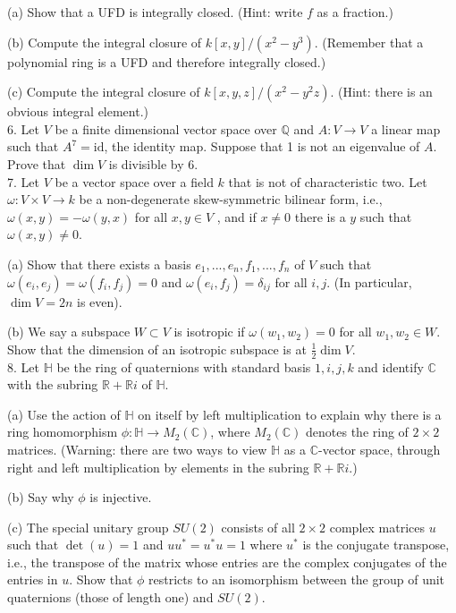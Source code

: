\documentclass[11pt]{article}
\newcommand{\Q}{\mathbb{Q}}
\newcommand{\R}{\mathbb{R}}
\newcommand{\C}{\mathbb{C}}
\begin{document}
(a) Show that a UFD is integrally closed. (Hint: write $f$ as a fraction.)

(b) Compute the integral closure of $k[x,y]/(x^2-y^3)$. (Remember that
a polynomial ring is a UFD and therefore integrally closed.)

(c) Compute the integral closure of $k[x,y,z]/(x^2-y^2z)$. (Hint: there
is an obvious integral element.)\\

6. Let $V$ be a finite dimensional vector space over $\Q$ and $A: V \to V$ a
linear map such that $A^7 = \mbox{id}$, the identity map. Suppose that 1 is not
an eigenvalue of $A$. Prove that $\dim V$ is divisible by 6.\\

7. Let $V$ be a vector space over a field $k$ that is not of characteristic two.
Let $\omega:V\times V \to k$ be a non-degenerate skew-symmetric bilinear form,
i.e., $\omega(x, y) = -\omega (y, x)$ for all $x, y \in V$ , and if $x\neq 0$ there is a $y$ such
that $\omega(x, y) \neq  0$.

(a) Show that there exists a basis $e_1, . . . , e_n, f_1, . . . , f_n$ of $V$ such that $\omega(e_i,e_j) = \omega(f_i,f_j) = 0$ and $\omega(e_i,f_j) = \delta_{ij}$ for all $i,j.$ (In particular, $\dim V = 2n$ is even). 

(b) We say a subspace $W\subset V$ is isotropic if $\omega(w_1,w_2) = 0$ for all $w_1,w_2\in W$. Show that the dimension of an isotropic subspace is
at $\frac{1}{2}\dim V$.\\

8. Let $\mathbb H$ be the ring of quaternions with standard basis $1, i, j, k$ and identify
$\C$ with the subring $\R + \R i$ of  $\mathbb H$.

(a) Use the action of $\mathbb H$ on itself by left multiplication to explain why
there is a ring homomorphism $\phi: \mathbb H \to M_2(\C)$, where $M_2(\C)$
denotes the ring of $2\times 2$ matrices. (Warning: there are two ways to
view $\mathbb H$ as a $\C$-vector space, through right and left multiplication
by elements in the subring $\R + \R i$.)

(b) Say why $\phi$  is injective.

(c) The special unitary group $SU(2)$ consists of all $ 2\times 2$ complex
matrices $u$ such that $\det(u) = 1$ and $uu^* = u^*u = 1$ where $u^*$
is the conjugate transpose, i.e., the transpose of the matrix whose
entries are the complex conjugates of the entries in $u$. Show that $\phi$
restricts to an isomorphism between the group of unit quaternions
(those of length one) and $SU(2)$.
\end{document}
